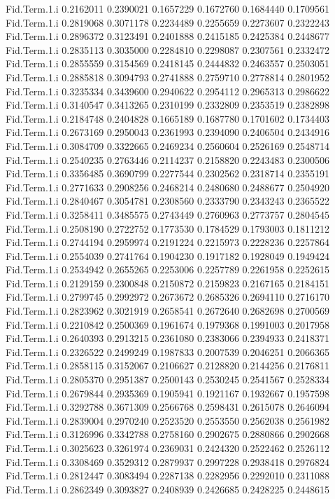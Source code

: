 \documentclass[11pt]{article} %
\begin{document}
\begin{Schunk}
\begin{Soutput}
Fid.Term.1.i 0.2162011 0.2390021 0.1657229 0.1672760 0.1684440 0.1709561
Fid.Term.1.i 0.2819068 0.3071178 0.2234489 0.2255659 0.2273607 0.2322243
Fid.Term.1.i 0.2896372 0.3123491 0.2401888 0.2415185 0.2425384 0.2448677
Fid.Term.1.i 0.2835113 0.3035000 0.2284810 0.2298087 0.2307561 0.2332472
Fid.Term.1.i 0.2855559 0.3154569 0.2418145 0.2444832 0.2463557 0.2503051
Fid.Term.1.i 0.2885818 0.3094793 0.2741888 0.2759710 0.2778814 0.2801952
Fid.Term.1.i 0.3235334 0.3439600 0.2940622 0.2954112 0.2965313 0.2986622
Fid.Term.1.i 0.3140547 0.3413265 0.2310199 0.2332809 0.2353519 0.2382898
Fid.Term.1.i 0.2184748 0.2404828 0.1665189 0.1687780 0.1701602 0.1734403
Fid.Term.1.i 0.2673169 0.2950043 0.2361993 0.2394090 0.2406504 0.2434916
Fid.Term.1.i 0.3084709 0.3322665 0.2469234 0.2560604 0.2526169 0.2548714
Fid.Term.1.i 0.2540235 0.2763446 0.2114237 0.2158820 0.2243483 0.2300506
Fid.Term.1.i 0.3356485 0.3690799 0.2277544 0.2302562 0.2318714 0.2355191
Fid.Term.1.i 0.2771633 0.2908256 0.2468214 0.2480680 0.2488677 0.2504920
Fid.Term.1.i 0.2840467 0.3054781 0.2308560 0.2333790 0.2343243 0.2365522
Fid.Term.1.i 0.3258411 0.3485575 0.2743449 0.2760963 0.2773757 0.2804545
Fid.Term.1.i 0.2508190 0.2722752 0.1773530 0.1784529 0.1793003 0.1811212
Fid.Term.1.i 0.2744194 0.2959974 0.2191224 0.2215973 0.2228236 0.2257864
Fid.Term.1.i 0.2554039 0.2741764 0.1904230 0.1917182 0.1928049 0.1949424
Fid.Term.1.i 0.2534942 0.2655265 0.2253006 0.2257789 0.2261958 0.2252615
Fid.Term.1.i 0.2129159 0.2300848 0.2150872 0.2159823 0.2167165 0.2184151
Fid.Term.1.i 0.2799745 0.2992972 0.2673672 0.2685326 0.2694110 0.2716170
Fid.Term.1.i 0.2823962 0.3021919 0.2658541 0.2672640 0.2682698 0.2700569
Fid.Term.1.i 0.2210842 0.2500369 0.1961674 0.1979368 0.1991003 0.2017958
Fid.Term.1.i 0.2640393 0.2913215 0.2361080 0.2383066 0.2394933 0.2418371
Fid.Term.1.i 0.2326522 0.2499249 0.1987833 0.2007539 0.2046251 0.2066365
Fid.Term.1.i 0.2858115 0.3152067 0.2106627 0.2128820 0.2144256 0.2176811
Fid.Term.1.i 0.2805370 0.2951387 0.2500143 0.2530245 0.2541567 0.2528334
Fid.Term.1.i 0.2679844 0.2935369 0.1905941 0.1921167 0.1932667 0.1957598
Fid.Term.1.i 0.3292788 0.3671309 0.2566768 0.2598431 0.2615078 0.2646094
Fid.Term.1.i 0.2839004 0.2970240 0.2523520 0.2553550 0.2562038 0.2561982
Fid.Term.1.i 0.3126996 0.3342788 0.2758160 0.2902675 0.2880866 0.2902668
Fid.Term.1.i 0.3025623 0.3261974 0.2369031 0.2424320 0.2522462 0.2526112
Fid.Term.1.i 0.3308469 0.3529312 0.2879937 0.2997228 0.2938418 0.2976824
Fid.Term.1.i 0.2812447 0.3083494 0.2287138 0.2282956 0.2292010 0.2311088
Fid.Term.1.i 0.2862349 0.3093827 0.2408939 0.2426685 0.2428225 0.2448615

\end{Soutput}
\end{Schunk}
\end{document}
